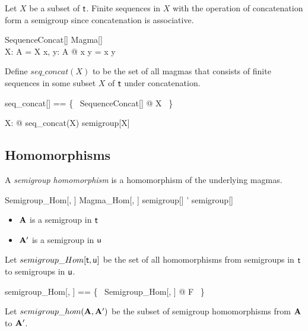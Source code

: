 \documentclass{amsart}
\begin{document}
\begin{example}
Let $X$ be a subset of $\mathsf{t}$.
Finite sequences in $X$ with the operation of concatenation form a semigroup
since concatenation is associative.

\begin{schema}{SequenceConcat}[\genT]
	Magma[\seq \genT] \\
	X: \power \genT
\where
	A = \seq X
\also
	\forall x, y: A @ x \opG y = x \cat y
\end{schema}

Define $seq\_concat(X)$ to be the set of all magmas that consists of finite sequences in some subset
$X$ of $\mathsf{t}$ under concatenation.

\begin{zed}
	seq\_concat[\genT] == \{~ SequenceConcat[\genT] @ X \mapsto \strucA ~\}
\end{zed}

\begin{zed}
	\forall X: \power \setT @ seq\_concat(X) \in semigroup[\seq X]
\end{zed}

\end{example}

\subsection{Homomorphisms}

A \textit{semigroup homomorphism} is a homomorphism of the underlying magmas.

\begin{schema}{Semigroup\_Hom}[\genT, \genU]
	Magma\_Hom[\genT, \genU]
\where
	\strucA \in semigroup[\genT]
\also
	\strucA' \in semigroup[\genU]
\end{schema}

\begin{itemize}
	\item $\mathbf{A}$ is a semigroup in $\mathsf{t}$
	\item $\mathbf{A}'$ is a semigroup in $\mathsf{u}$
\end{itemize}

Let $semigroup\_Hom[\mathsf{t}, \mathsf{u}]$ be the set of all homomorphisms from semigroups in $\mathsf{t}$ to
semigroups in $\mathsf{u}$.

\begin{zed}
	semigroup\_Hom[\genT, \genU] == \{~ Semigroup\_Hom[\genT, \genU] @ F ~\}
\end{zed}

Let $semigroup\_hom(\mathbf{A}, \mathbf{A}')$ be the subset of semigroup homomorphisms from $\mathbf{A}$ to $\mathbf{A}'$.
\end{document}
